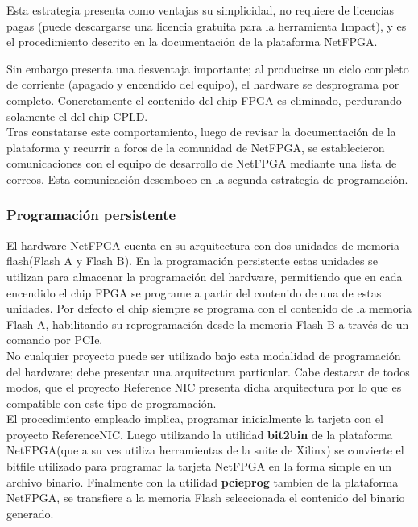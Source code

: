 Esta estrategia presenta como ventajas su simplicidad, no requiere de licencias pagas (puede descargarse una licencia gratuita para la herramienta Impact), y es el procedimiento descrito en la documentaci\'on de la plataforma NetFPGA.

Sin embargo presenta una desventaja importante; al producirse un ciclo completo de corriente (apagado y encendido del equipo), el hardware se desprograma por completo. Concretamente el contenido del chip FPGA es eliminado, perdurando solamente el del chip CPLD.\\

Tras constatarse este comportamiento, luego de revisar la documentaci\'on de la plataforma y recurrir a foros de la comunidad de NetFPGA, se establecieron comunicaciones con el equipo de desarrollo de NetFPGA mediante una lista de correos. Esta comunicaci\'on desemboco en la segunda estrategia de programaci\'on.

\subsubsection{Programaci\'on persistente}
El hardware NetFPGA cuenta en su arquitectura con dos unidades de memoria flash(Flash A y Flash B). En la programaci\'on persistente estas unidades se utilizan para almacenar la programaci\'on del hardware, permitiendo que en cada encendido el chip FPGA se programe a partir del contenido de una de estas unidades. Por defecto el chip siempre se programa con el contenido de la memoria Flash A, habilitando su reprogramaci\'on desde la memoria Flash B a trav\'es de un comando por PCIe.\\

No cualquier proyecto puede ser utilizado bajo esta modalidad de programaci\'on del hardware; debe presentar una arquitectura particular. Cabe destacar de todos modos, que el proyecto Reference NIC presenta dicha arquitectura por lo que es compatible con este tipo de programaci\'on.\\

El procedimiento empleado implica, programar inicialmente la tarjeta con el proyecto ReferenceNIC. Luego utilizando la utilidad \textbf{bit2bin} de la plataforma NetFPGA(que a su ves utiliza herramientas de la suite de Xilinx) se convierte el bitfile utilizado para programar la tarjeta NetFPGA en la forma simple en un archivo binario. Finalmente con la utilidad \textbf{pcieprog}  tambien de la plataforma NetFPGA, se transfiere a la memoria Flash seleccionada el contenido del binario generado.\\

